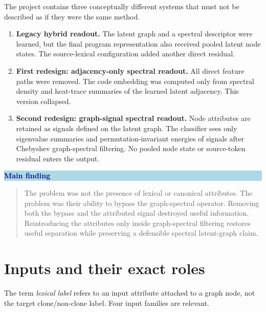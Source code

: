 \documentclass[11pt,a4paper]{article}
\newenvironment{keybox}[1]{%
  \begin{center}\begin{minipage}{0.94\linewidth}
  \colorbox{lightblue}{\parbox{0.95\linewidth}{\textcolor{navy}{\textbf{#1}}\par\smallskip}}
  \vspace{-6pt}\begin{quote}
}{\end{quote}\end{minipage}\end{center}}
\begin{document}
The project contains three conceptually different systems that must not be
described as if they were the same method.

\begin{enumerate}
\item \textbf{Legacy hybrid readout.} The latent graph and a spectral descriptor
were learned, but the final program representation also received pooled latent
node states. The source-lexical configuration added another direct residual.
\item \textbf{First redesign: adjacency-only spectral readout.} All direct
feature paths were removed. The code embedding was computed only from spectral
density and heat-trace summaries of the learned latent adjacency. This version
collapsed.
\item \textbf{Second redesign: graph-signal spectral readout.} Node attributes
are retained as signals defined on the latent graph. The classifier sees only
eigenvalue summaries and permutation-invariant energies of signals after
Chebyshev graph-spectral filtering. No pooled node state or source-token
residual enters the output.
\end{enumerate}

\begin{keybox}{Main finding}
The problem was not the presence of lexical or canonical attributes. The
problem was their ability to bypass the graph-spectral operator. Removing both
the bypass and the attributed signal destroyed useful information. Reintroducing
the attributes only inside graph-spectral filtering restores useful separation
while preserving a defensible spectral latent-graph claim.
\end{keybox}

\section{Inputs and their exact roles}

The term \emph{lexical label} refers to an input attribute attached to a graph
node, not the target clone/non-clone label. Four input families are relevant.
\end{document}
